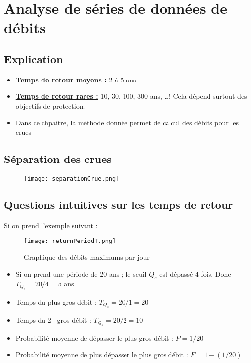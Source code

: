 \chapter{Analyse de séries de données de débits}

\section{Explication}
\begin{itemize}
    \item \underline{\textbf{Temps de retour moyens :}} 2 à 5 ans
    \item \underline{\textbf{Temps de retour rares :}} 10, 30, 100, 300 ans, \dots ! Cela dépend surtout des objectifs de protection.
    \item Dans ce chpaitre, la méthode donnée permet de calcul des débits pour les crues
\end{itemize}

\section{Séparation des crues}
\begin{figure}[H]
    \centering
    \texttt{[image: separationCrue.png]}
    \label{fig:separationCrues}
\end{figure}

\newpage

\section{Questions intuitives sur les temps de retour}
Si on prend l'exemple suivant :
\begin{figure}[h!]
    \centering
    \texttt{[image: returnPeriodT.png]}
    \caption{Graphique des débits maximums par jour}
    \label{fig:graphiqueExemple}
\end{figure}

\begin{itemize}
    \item Si on prend une période de 20 ans ; le seuil $Q_s$ est dépassé 4 fois. Donc $T_{Q_{s}} = 20/4 = 5$ ans
    \item Temps du plus gros débit : $T_{Q_{s}} = 20/1 = 20$
    \item Temps du 2\ieme ~ gros débit : $T_{Q_{s}} = 20/2 = 10$
    \item Probabilité moyenne de dépasser le plus gros débit : $P = 1/20$
    \item Probabilité moyenne de plus dépasser le plus gros débit : $F=1-(1/20)$
\end{itemize}

